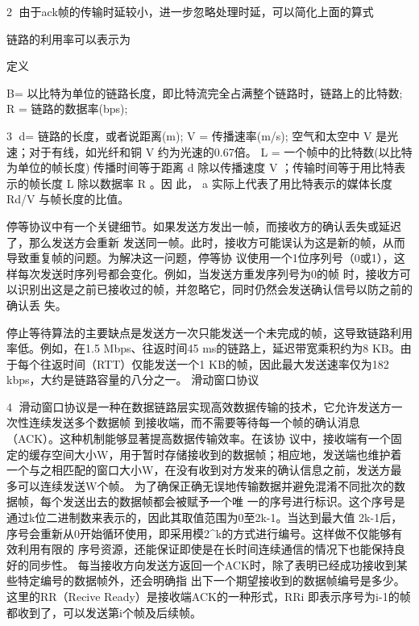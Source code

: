                                                                                         2
由于ack帧的传输时延较小，进一步忽略处理时延，可以简化上面的算式



链路的利用率可以表示为




定义




B=  以比特为单位的链路长度，即比特流完全占满整个链路时，链路上的比特数;
R = 链路的数据率(bps);

                                         3
d=  链路的长度，或者说距离(m);
V = 传播速率(m/s); 空气和太空中 V 是光速；对于有线，如光纤和铜 V 约为光速的0.67倍。
L = 一个帧中的比特数(以比特为单位的帧长度)
传播时间等于距离 d 除以传播速度 V ；传输时间等于用比特表示的帧长度 L 除以数据率 R 。因
此， a 实际上代表了用比特表示的媒体长度 Rd/V 与帧长度的比值。

停等协议中有一个关键细节。如果发送方发出一帧，而接收方的确认丢失或延迟了，那么发送方会重新
发送同一帧。此时，接收方可能误认为这是新的帧，从而导致重复帧的问题。为解决这一问题，停等协
议使用一个1位序列号（0或1），这样每次发送时序列号都会变化。例如，当发送方重发序列号为0的帧
时，接收方可以识别出这是之前已接收过的帧，并忽略它，同时仍然会发送确认信号以防之前的确认丢
失。




停止等待算法的主要缺点是发送方一次只能发送一个未完成的帧，这导致链路利用率低。例如，在1.5
Mbps、往返时间45 ms的链路上，延迟带宽乘积约为8 KB。由于每个往返时间（RTT）仅能发送一个1
KB的帧，因此最大发送速率仅为182 kbps，大约是链路容量的八分之一。
滑动窗口协议


                                                       4
滑动窗口协议是一种在数据链路层实现高效数据传输的技术，它允许发送方一次性连续发送多个数据帧
到接收端，而不需要等待每一个帧的确认消息（ACK）。这种机制能够显著提高数据传输效率。在该协
议中，接收端有一个固定的缓存空间大小W，用于暂时存储接收到的数据帧；相应地，发送端也维护着
一个与之相匹配的窗口大小W，在没有收到对方发来的确认信息之前，发送方最多可以连续发送W个帧。
为了确保正确无误地传输数据并避免混淆不同批次的数据帧，每个发送出去的数据帧都会被赋予一个唯
一的序号进行标识。这个序号是通过k位二进制数来表示的，因此其取值范围为0至2k-1。当达到最大值
2k-1后，序号会重新从0开始循环使用，即采用模2^k的方式进行编号。这样做不仅能够有效利用有限的
序号资源，还能保证即使是在长时间连续通信的情况下也能保持良好的同步性。
每当接收方向发送方返回一个ACK时，除了表明已经成功接收到某些特定编号的数据帧外，还会明确指
出下一个期望接收到的数据帧编号是多少。这里的RR（Recive Ready）是接收端ACK的一种形式，RRi
即表示序号为i-1的帧都收到了，可以发送第i个帧及后续帧。




